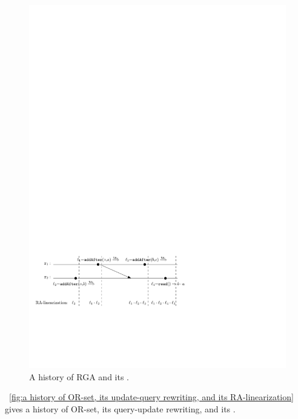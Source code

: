 \begin{figure}[t]
  \centering
  \includegraphics[width=0.6 \textwidth]{figures/RGAHisandLin.pdf}
\vspace{-10pt}
  \caption{A history of RGA and its \crdtlinearization{}.}
  \label{fig:a history of RGA and its RA-linearization}
\end{figure}


\figurename~\ref{fig:a history of OR-set, its update-query rewriting, and its RA-linearization} gives a history of OR-set, its query-update rewriting, and its \crdtlinearization{}.

